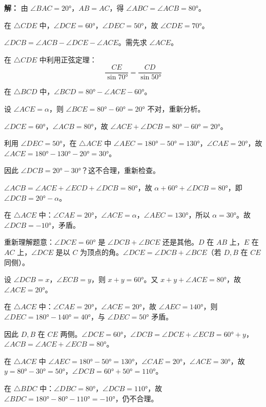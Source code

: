 \documentclass[12pt, a4paper]{ctexart}
\begin{document}
\textbf{解：} 由 $\angle BAC = 20°$，$AB = AC$，得 $\angle ABC = \angle ACB = 80°$。

在 $\triangle CDE$ 中，$\angle DCE = 60°$，$\angle DEC = 50°$，故 $\angle CDE = 70°$。

$\angle DCB = \angle ACB - \angle DCE - \angle ACE$。需先求 $\angle ACE$。

在 $\triangle CDE$ 中利用正弦定理：
$$\frac{CE}{\sin 70°} = \frac{CD}{\sin 50°}$$

在 $\triangle BCD$ 中，$\angle BCD = 80° - \angle ACE - 60°$。

设 $\angle ACE = \alpha$，则 $\angle BCE = 80° - 60° = 20°$ 不对，重新分析。

$\angle DCE = 60°$，$\angle ACB = 80°$，故 $\angle ACE + \angle DCB = 80° - 60° = 20°$。

利用 $\angle DEC = 50°$，在 $\triangle ACE$ 中 $\angle AEC = 180° - 50° = 130°$，$\angle CAE = 20°$，故 $\angle ACE = 180° - 130° - 20° = 30°$。

因此 $\angle DCB = 20° - 30°$？这不合理，重新检查。

$\angle ACB = \angle ACE + \angle ECD + \angle DCB = 80°$，故 $\alpha + 60° + \angle DCB = 80°$，即 $\angle DCB = 20° - \alpha$。

在 $\triangle ACE$ 中：$\angle CAE = 20°$，$\angle ACE = \alpha$，$\angle AEC = 130°$，所以 $\alpha = 30°$。故 $\angle DCB = -10°$，矛盾。

重新理解题意：$\angle DCE = 60°$ 是 $\angle DCB + \angle BCE$ 还是其他。$D$ 在 $AB$ 上，$E$ 在 $AC$ 上，$\angle DCE$ 是以 $C$ 为顶点的角。$\angle DCE = \angle DCB + \angle BCE$（若 $D, B$ 在 $CE$ 同侧）。

设 $\angle DCB = x$，$\angle ECB = y$，则 $x + y = 60°$。又 $x + y + \angle ACE = 80°$，故 $\angle ACE = 20°$。

在 $\triangle ACE$ 中：$\angle CAE = 20°$，$\angle ACE = 20°$，故 $\angle AEC = 140°$，则 $\angle DEC = 180° - 140° = 40°$，与 $\angle DEC = 50°$ 矛盾。

因此 $D, B$ 在 $CE$ 两侧。$\angle DCE = 60°$，$\angle DCB = \angle DCE + \angle ECB = 60° + y$，$\angle ACB = \angle ACE + \angle ECB = 80°$。

在 $\triangle ACE$ 中 $\angle AEC = 180° - 50° = 130°$，$\angle CAE = 20°$，$\angle ACE = 30°$，故 $y = 80° - 30° = 50°$，$\angle DCB = 60° + 50° = 110°$。

在 $\triangle BDC$ 中：$\angle DBC = 80°$，$\angle DCB = 110°$，故 $\angle BDC = 180° - 80° - 110° = -10°$，仍不合理。
\end{document}
